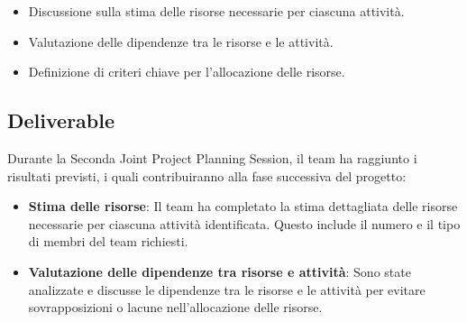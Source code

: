 \begin{itemize}
    \item Discussione sulla stima delle risorse necessarie per ciascuna attività.
    \item Valutazione delle dipendenze tra le risorse e le attività.
    \item Definizione di criteri chiave per l'allocazione delle risorse.
\end{itemize}

\subsection{Deliverable}

Durante la Seconda Joint Project Planning Session, il team ha raggiunto i risultati previsti, i quali contribuiranno alla fase successiva del progetto:

\begin{itemize}
    \item \textbf{Stima delle risorse}: Il team ha completato la stima dettagliata delle risorse necessarie per ciascuna attività identificata. Questo include il numero e il tipo di membri del team richiesti.
    \item \textbf{Valutazione delle dipendenze tra risorse e attività}: Sono state analizzate e discusse le dipendenze tra le risorse e le attività per evitare sovrapposizioni o lacune nell'allocazione delle risorse.
\end{itemize}


